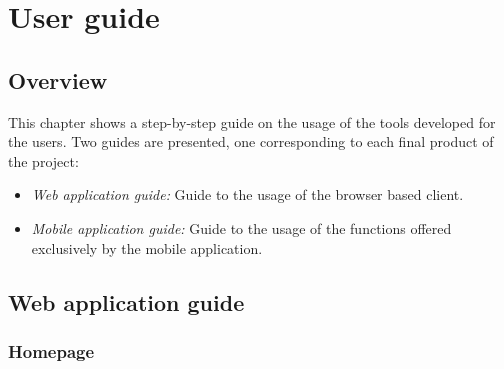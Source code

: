 \chapter{User guide}\label{ch:user-guide}

\section{Overview}

This chapter shows a step-by-step guide on the usage of the tools developed for the users. Two guides are presented, one corresponding to each final product of the project:

\begin{itemize}
\item \textit{Web application guide:} Guide to the usage of the browser based client.

\item \textit{Mobile application guide:} Guide to the usage of the functions offered exclusively by the mobile application.
\end{itemize}

\section{Web application guide}

\subsection{Homepage}

